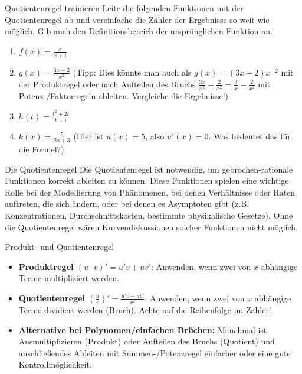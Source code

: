 \begin{aufgabenumgebung}{Quotientenregel trainieren}
Leite die folgenden Funktionen mit der Quotientenregel ab und vereinfache die Zähler der Ergebnisse so weit wie möglich. Gib auch den Definitionsbereich der ursprünglichen Funktion an.
\begin{enumerate}
    \item $f(x) = \frac{x}{x+1}$
    \item $g(x) = \frac{3x-2}{x^2}$ (Tipp: Dies könnte man auch als $g(x) = (3x-2)x^{-2}$ mit der Produktregel oder nach Aufteilen des Bruchs $\frac{3x}{x^2} - \frac{2}{x^2} = \frac{3}{x} - \frac{2}{x^2}$ mit Potenz-/Faktorregeln ableiten. Vergleiche die Ergebnisse!)
    \item $h(t) = \frac{t^2+2t}{t-1}$
    \item $k(x) = \frac{5}{2x+3}$ (Hier ist $u(x)=5$, also $u'(x)=0$. Was bedeutet das für die Formel?)
\end{enumerate}
\end{aufgabenumgebung}

\begin{warumwichtigumgebung}{Die Quotientenregel}
Die Quotientenregel ist notwendig, um gebrochen-rationale Funktionen korrekt ableiten zu können. Diese Funktionen spielen eine wichtige Rolle bei der Modellierung von Phänomenen, bei denen Verhältnisse oder Raten auftreten, die sich ändern, oder bei denen es Asymptoten gibt (z.B. Konzentrationen, Durchschnittskosten, bestimmte physikalische Gesetze). Ohne die Quotientenregel wären Kurvendiskussionen solcher Funktionen nicht möglich.
\end{warumwichtigumgebung}

\begin{kurzknappumgebung}{Produkt- und Quotientenregel}
\begin{itemize}
    \item \textbf{Produktregel $(u \cdot v)' = u'v + uv'$}: Anwenden, wenn zwei von $x$ abhängige Terme multipliziert werden.
    \item \textbf{Quotientenregel $(\frac{u}{v})' = \frac{u'v - uv'}{v^2}$}: Anwenden, wenn zwei von $x$ abhängige Terme dividiert werden (Bruch). Achte auf die Reihenfolge im Zähler!
    \item \textbf{Alternative bei Polynomen/einfachen Brüchen:} Manchmal ist Ausmultiplizieren (Produkt) oder Aufteilen des Bruchs (Quotient) und anschließendes Ableiten mit Summen-/Potenzregel einfacher oder eine gute Kontrollmöglichkeit.
\end{itemize}
\end{kurzknappumgebung}

